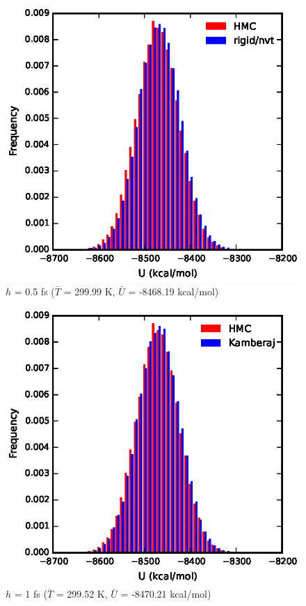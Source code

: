 \documentclass[
journal=jctcce,
layout=twocolumn
]{achemso}
\newcommand{\timestep}{h}
\begin{document}
\begin{figure}
    \caption{$\timestep$ = 0.5 fs ($\bar{T}$ = 299.99 K, $\bar{U}$ = -8468.19 kcal/mol)}
	\includegraphics{potenergy_05}
\end{figure}

\begin{figure}
    \caption{$\timestep$ = 1 fs ($\bar{T}$ = 299.52 K, $\bar{U}$ = -8470.21 kcal/mol)}
	\includegraphics{potenergy_kamb}
\end{figure}
\end{document}
